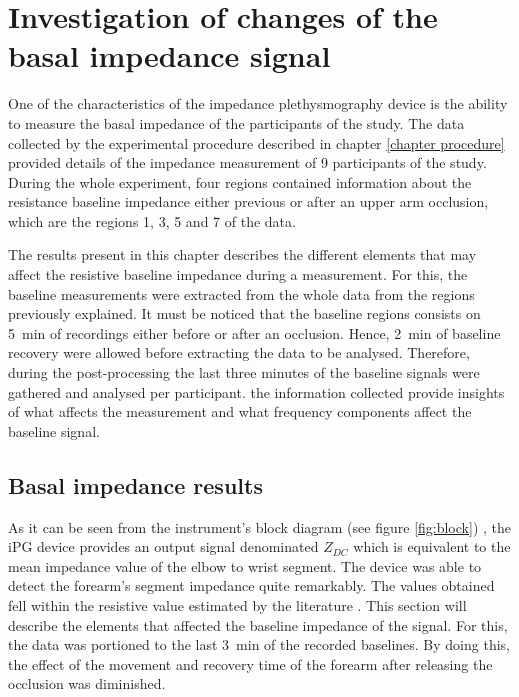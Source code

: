 
\chapter{Investigation of changes of the basal impedance signal}  %
\label{chapter basal}

\ifpdf
\graphicspath{{Chapter6/Figs/Raster/}{Chapter6/Figs/PDF/}{Chapter6/Figs/}}
\else
\graphicspath{{Chapter6/Figs/Vector/}{Chapter6/Figs/}}
\fi

One of the characteristics of the impedance plethysmography device is the ability to measure the basal impedance of the participants of the study. The data collected by the experimental procedure described in chapter \ref{chapter procedure} provided details of the impedance measurement of 9 participants of the study. During the whole experiment, four regions contained information about the resistance baseline impedance either previous or after an upper arm occlusion, which are the regions 1, 3, 5 and 7 of the data. 

The results present in this chapter describes the different elements that may affect the resistive baseline impedance during a measurement. For this, the baseline measurements were extracted from the whole data from the regions previously explained. It must be noticed that the baseline regions consists on \SI{5}{\minute} of recordings either before or after an occlusion. Hence, \SI{2}{\minute} of baseline recovery were allowed before extracting the data to be analysed. Therefore, during the post-processing the last three minutes of the baseline signals were gathered and analysed per participant. the information collected provide insights of what affects the measurement and what frequency components affect the baseline signal. 

\section{Basal impedance results}
\label{section basal 1}
As it can be seen from the instrument's block diagram (see figure \ref{fig:block}) , the iPG device provides an output signal denominated $Z_{DC}$ which is equivalent to the mean impedance value of the elbow to wrist segment. The device was able to detect the forearm's segment impedance quite remarkably. The values obtained fell within the resistive value estimated by the literature . This section will describe the elements that affected the baseline impedance of the signal. For this, the data was portioned to the last \SI{3}{\minute} of the recorded baselines. By doing this, the effect of the movement and recovery time of the forearm after releasing the occlusion was diminished. 

